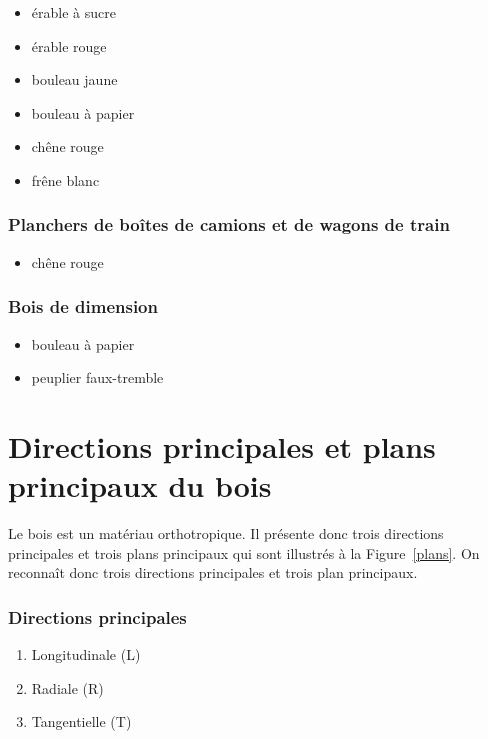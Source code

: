 \begin{itemize} 
\item érable à sucre 
\item érable rouge
\item bouleau jaune
\item bouleau à papier
\item chêne rouge
\item frêne blanc
\end{itemize}

\subsubsection{Planchers de boîtes de camions et de wagons de train}

\begin{itemize} 
\item chêne rouge
\end{itemize}

\subsubsection{Bois de dimension}

\begin{itemize} 
\item bouleau à papier
\item peuplier faux-tremble
\end{itemize}

\section{Directions principales et plans principaux du bois}\label{directions}

Le bois est un matériau orthotropique. Il présente donc trois directions principales et trois plans principaux qui sont illustrés à la Figure~\ref{plans}. On reconnaît donc trois directions principales et trois plan principaux.

\subsubsection{Directions principales}

\begin{enumerate}
\item Longitudinale (L)
\item Radiale (R)
\item Tangentielle (T)
\end{enumerate}

